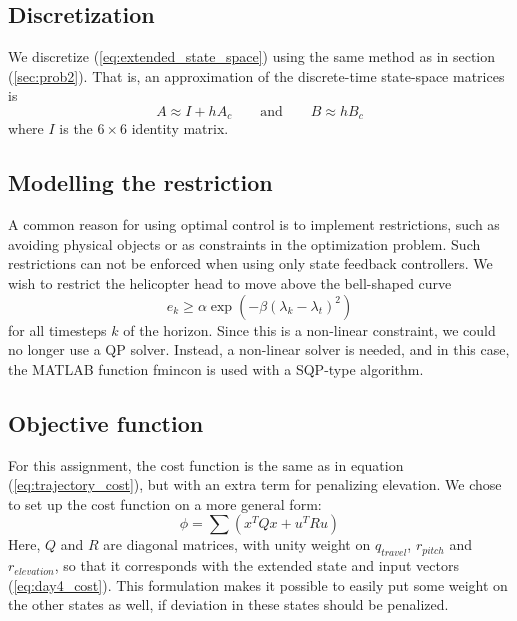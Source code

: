 \subsection{Discretization}
We discretize (\ref{eq:extended_state_space}) using the same method as in section (\ref{sec:prob2}). That is, an approximation of the discrete-time state-space matrices is
\begin{equation}
    A \approx I + hA_c
    \qquad\text{and}\qquad
    B \approx hB_c
\end{equation}
where $I$ is the $6\times6$ identity matrix.

\subsection{Modelling the restriction}
A common reason for using optimal control is to implement restrictions, such as avoiding physical objects or as constraints in the optimization problem. Such restrictions can not be enforced when using only state feedback controllers. We wish to restrict the helicopter head to move above the bell-shaped curve
\begin{equation}
    e_k \geq \alpha \exp (-\beta (\lambda_k - \lambda_t)^2 )
\end{equation}
for all timesteps $k$ of the horizon. Since this is a non-linear constraint, we could no longer use a QP solver. Instead, a non-linear solver is needed, and in this case, the MATLAB function fmincon is used with a SQP-type algorithm.

\subsection{Objective function}
For this assignment, the cost function is the same as in equation (\ref{eq:trajectory_cost}), but with an extra term for penalizing elevation. We chose to set up the cost function on a more general form:
\begin{equation}
    \phi=\sum(x^{T}Qx+u^{T}Ru)
\end{equation}
Here, $Q$ and $R$ are diagonal matrices, with unity weight on $q_{travel}$, $r_{pitch}$ and $r_{elevation}$, so that it corresponds with the extended state and input vectors (\ref{eq:day4_cost}). This formulation makes it possible to easily put some weight on the other states as well, if deviation in these states should be penalized.

